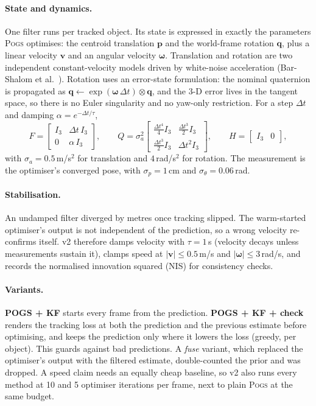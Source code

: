 \documentclass[10pt,a4paper]{article}
\newcommand{\pogs}{\textsc{Pogs}}
\begin{document}
\paragraph{State and dynamics.} One filter runs per tracked object. Its state is
expressed in exactly the parameters \pogs{} optimises: the centroid translation
$\mathbf{p}$ and the world-frame rotation $\mathbf{q}$, plus a linear velocity
$\mathbf{v}$ and an angular velocity $\bm{\omega}$. Translation and rotation are
two independent constant-velocity models driven by white-noise acceleration
(Bar-Shalom et al.~\cite{barshalom}). Rotation uses an error-state formulation:
the nominal quaternion is propagated as $\mathbf{q}\leftarrow\exp(\bm{\omega}\,\Delta t)\otimes\mathbf{q}$,
and the 3-D error lives in the tangent space, so there is no Euler singularity
and no yaw-only restriction. For a step $\Delta t$ and damping
$\alpha = e^{-\Delta t/\tau}$,
\begin{equation}
F = \begin{bmatrix} I_3 & \Delta t\,I_3 \\ 0 & \alpha\,I_3\end{bmatrix},\qquad
Q = \sigma_a^2 \begin{bmatrix} \tfrac{\Delta t^4}{4} I_3 & \tfrac{\Delta t^3}{2} I_3\\[2pt]
\tfrac{\Delta t^3}{2} I_3 & \Delta t^2 I_3\end{bmatrix},\qquad
H = \begin{bmatrix} I_3 & 0\end{bmatrix},
\end{equation}
with $\sigma_a = 0.5$\,m/s$^2$ for translation and $4$\,rad/s$^2$ for rotation. The
measurement is the optimiser's converged pose, with $\sigma_p = 1$\,cm and
$\sigma_\theta = 0.06$\,rad.

\paragraph{Stabilisation.} An undamped filter diverged by metres once tracking
slipped. The warm-started optimiser's output is not independent of the
prediction, so a wrong velocity re-confirms itself. v2 therefore damps velocity
with $\tau = 1$\,s (velocity decays unless measurements sustain it), clamps
speed at $|\mathbf{v}|\le0.5$\,m/s and $|\bm{\omega}|\le3$\,rad/s, and records the
normalised innovation squared (NIS) for consistency checks.

\paragraph{Variants.} \textbf{POGS + KF} starts every frame from the prediction.
\textbf{POGS + KF + check} renders the tracking loss at both the prediction and
the previous estimate before optimising, and keeps the prediction only where it
lowers the loss (greedy, per object). This guards against bad predictions. A
\emph{fuse} variant, which replaced the optimiser's output with the filtered
estimate, double-counted the prior and was dropped. A speed claim needs an
equally cheap baseline, so v2 also runs every method at 10 and 5 optimiser
iterations per frame, next to plain \pogs{} at the same budget.
\end{document}
